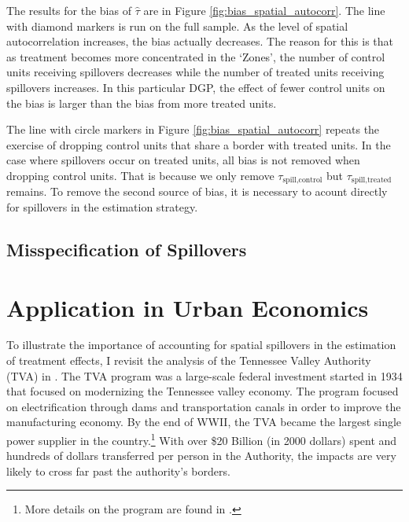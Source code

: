 \documentclass[11pt]{article}
\begin{document}
The results for the bias of $\hat{\tau}$ are in Figure \ref{fig:bias_spatial_autocorr}. The line with diamond markers is run on the full sample. As the level of spatial autocorrelation increases, the bias actually decreases. The reason for this is that as treatment becomes more concentrated in the `Zones', the number of control units receiving spillovers decreases while the number of treated units receiving spillovers increases. In this particular DGP, the effect of fewer control units on the bias is larger than the bias from more treated units. 

The line with circle markers in Figure \ref{fig:bias_spatial_autocorr} repeats the exercise of dropping control units that share a border with treated units. In the case where spillovers occur on treated units, all bias is not removed when dropping control units. That is because we only remove $\tau_{\text{spill,control}}$ but $\tau_{\text{spill,treated}}$ remains. To remove the second source of bias, it is necessary to acount directly for spillovers in the estimation strategy.


\subsection{Misspecification of Spillovers}




\section{Application in Urban Economics}

To illustrate the importance of accounting for spatial spillovers in the estimation of treatment effects, I revisit the analysis of the Tennessee Valley Authority (TVA) in \citet{Kline_Moretti_2014}. The TVA program was a large-scale federal investment started in 1934 that focused on modernizing the Tennessee valley economy. The program focused on electrification through dams and transportation canals in order to improve the manufacturing economy. By the end of WWII, the TVA became the largest single power supplier in the country.\footnote{More details on the program are found in \citet{Kline_Moretti_2014}.} With over \$20 Billion (in 2000 dollars) spent and hundreds of dollars transferred per person in the Authority, the impacts are very likely to cross far past the authority's borders. 
\end{document}
